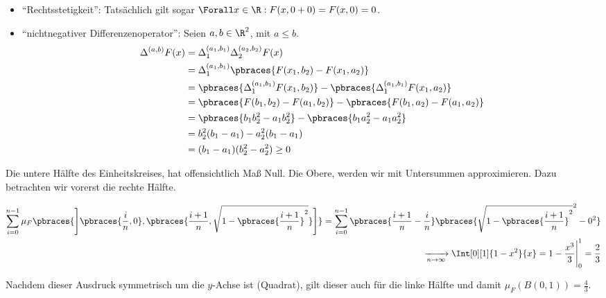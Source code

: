\begin{solution}

\phantom{}

\begin{itemize}

  \item \enquote{Rechtsstetigkeit}: Tatsächlich gilt sogar $\Forall x \in \R: F(x, 0 + 0) = F(x, 0) = 0$.

  \item \enquote{nichtnegativer Differenzenoperator}: Seien $a, b \in \R^2$, mit $a \leq b$.
  \begin{align*}
    \Delta^{(a, b)} F(x)
    & =
    \Delta_1^{(a_1, b_1)}
    \Delta_2^{(a_2, b_2)}
    F(x) \\
    & =
    \Delta_1^{(a_1, b_1)}
    \pbraces{F(x_1, b_2) - F(x_1, a_2)} \\
    & =
    \pbraces{\Delta_1^{(a_1, b_1)} F(x_1, b_2)} -
    \pbraces{\Delta_1^{(a_1, b_1)} F(x_1, a_2)} \\
    & =
    \pbraces{F(b_1, b_2) - F(a_1, b_2)} -
    \pbraces{F(b_1, a_2) - F(a_1, a_2)} \\
    & =
    \pbraces{b_1 b_2^2 - a_1 b_2^2} -
    \pbraces{b_1 a_2^2 - a_1 a_2^2} \\
    & =
    b_2^2 (b_1 - a_1) - a_2^2 (b_1 - a_1) \\
    & =
    (b_1 - a_1) (b_2^2 - a_2^2)
    \geq
    0
  \end{align*}

\end{itemize}

Die untere Hälfte des Einheitskreises, hat offensichtlich Maß Null. Die Obere, werden wir mit Untersummen approximieren. Dazu betrachten wir vorerst die rechte Hälfte.

\begin{align*}
  \sum_{i=0}^{n-1}
  \mu_F
  \pbraces
  {
    \Bigg ]
      \pbraces{\frac{i}{n}, 0},
      \pbraces{\frac{i+1}{n}, \sqrt{1 - \pbraces{\frac{i+1}{n}}^2}}
    \Bigg ]
  }
  =
  \sum_{i=0}^{n-1}
  \pbraces{\frac{i+1}{n} - \frac{i}{n}}
  \pbraces{\sqrt{1 - \pbraces{\frac{i+1}{n}}^2}^2 - 0^2} \\
  \xrightarrow[n \to \infty]{}
  \Int[0][1]{1 - x^2}{x}
  =
  1 - \frac{x^3}{3} \Bigg |_0^1
  =
  \frac{2}{3}
\end{align*}

Nachdem dieser Ausdruck symmetrisch um die $y$-Achse ist (Quadrat), gilt dieser auch für die linke Hälfte und damit $\mu_F(B(0, 1)) = \frac{4}{3}$.

\end{solution}

